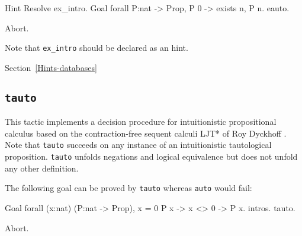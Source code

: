 \begin{coq_example}
Hint Resolve ex_intro.
Goal forall P:nat -> Prop, P 0 ->  exists n, P n.
eauto.
\end{coq_example}
\begin{coq_eval}
Abort.
\end{coq_eval}

Note that {\tt ex\_intro} should be declared as an
hint.

\SeeAlso Section~\ref{Hints-databases}

% 


\subsection{\tt tauto
\label{tauto}}

This tactic implements a decision procedure for intuitionistic propositional
calculus based on the contraction-free sequent calculi LJT* of Roy Dyckhoff
\cite{Dyc92}. Note that {\tt tauto} succeeds on any instance of an
intuitionistic tautological proposition. {\tt tauto} unfolds negations
and logical equivalence but does not unfold any other definition.

The following goal can be proved by {\tt tauto} whereas {\tt auto}
would fail:

\begin{coq_example}
Goal forall (x:nat) (P:nat -> Prop), x = 0 \/ P x -> x <> 0 -> P x.
  intros.
  tauto.
\end{coq_example}
\begin{coq_eval}
Abort.
\end{coq_eval}

